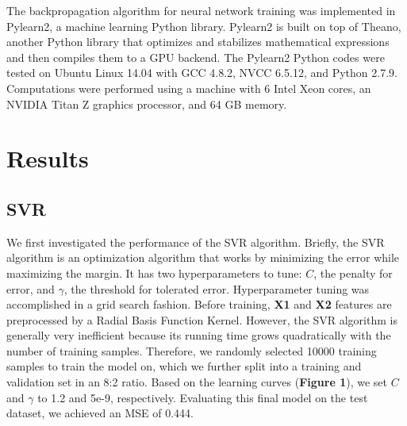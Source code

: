 \documentclass[12pt] {article}
\begin{document}
The backpropagation algorithm for neural network training was implemented in Pylearn2, a machine learning Python library. Pylearn2 is built on top of Theano, another Python library that optimizes and stabilizes mathematical expressions and then compiles them to a GPU backend. The Pylearn2 Python codes were tested on Ubuntu Linux 14.04 with GCC 4.8.2, NVCC 6.5.12, and Python 2.7.9. Computations were performed using a machine with 6 Intel Xeon cores, an NVIDIA Titan Z graphics processor, and 64 GB memory.

\section{Results}
\subsection{SVR}
We first investigated the performance of the SVR algorithm. Briefly, the SVR algorithm is an optimization algorithm that works by minimizing the error while maximizing the margin. It has two hyperparameters to tune: $C$, the penalty for error, and $\gamma$, the threshold for tolerated error. Hyperparameter tuning was accomplished in a grid search fashion. Before training, \textbf{X1} and \textbf{X2} features are preprocessed by a Radial Basis Function Kernel. However, the SVR algorithm is generally very inefficient because its running time grows quadratically with the number of training samples. Therefore, we randomly selected 10000 training samples to train the model on, which we further split into a training and validation set in an 8:2 ratio. Based on the learning curves (\textbf{Figure 1}), we set $C$ and $\gamma$ to 1.2 and 5e-9, respectively. Evaluating this final model on the test dataset, we achieved an MSE of 0.444.
\end{document}
